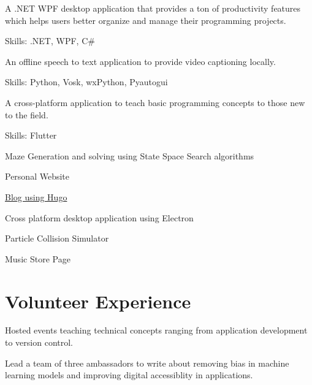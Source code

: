\documentclass[]{absolute}
\begin{document}
\begin{minipage}[t]{0.65\textwidth}
\begin{tightemize}
\item A .NET WPF desktop application that provides a ton of productivity features which helps users better organize and manage their programming projects.
\item Skills: .NET, WPF, C\#
\end{tightemize}
\sectionsep

\begin{tightemize}
\item An offline speech to text application to provide video captioning locally.
\item Skills: Python, Vosk, wxPython, Pyautogui
\end{tightemize}
\sectionsep

\begin{tightemize}
\item A cross-platform application to teach basic programming concepts to those new to the field.
\item Skills: Flutter
\end{tightemize}
\sectionsep

\begin{tightemize}
\item Maze Generation and solving using State Space Search algorithms
\item Personal Website
\item \href{https://code-explorer.github.io/blog/}{Blog using Hugo}
\item Cross platform desktop application using Electron
\item Particle Collision Simulator
\item Music Store Page
\end{tightemize}
\sectionsep


\section{Volunteer Experience}

\begin{tightemize}
\item Hosted events teaching technical concepts ranging from application development to version control.
\item Lead a team of three ambassadors to write about removing bias in machine learning models and improving digital accessiblity in applications.
\end{tightemize}
\sectionsep


\end{minipage}
\end{document}
